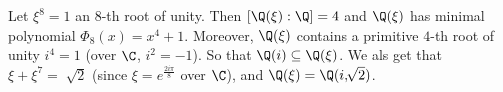 \begin{example}\label{1.19}
    Let $\xi^8=1$ an  $8$-th root of unity. Then  $[\Q(\xi):\Q]=4$ and $\Q(\xi)$
    has minimal polynomial $\Phi_8(x)=x^4+1$. Moreover, $\Q(\xi)$ contains a
    primitive $4$-th root of unity $i^4=1$ (over $\C$,  $i^2=-1$). So that
    $\Q(i) \subseteq \Q(\xi)$. We als get that $\xi+\xi^7=\sqrt[]{2}$ (since
    $\xi=e^{\frac{2i\pi}{8}}$ over $\C$), and $\Q(\xi)=\Q(i,\sqrt[]{2})$.
\end{example}
